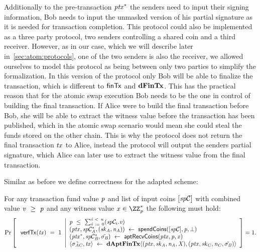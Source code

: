 \begin{definition}
\begin{itemize}
        Additionally to the pre-transaction $\mathit{ptx}^*$ the senders need to input their signing information, Bob needs to input the unmasked version of his partial signature as it is needed for transaction completion.
        This protocol could also be implemented as a three party protocol, two senders controlling a shared coin and a third receiver.
        However, as in our case, which we will describe later in~\cref{sec:atom:protocols}, one of the two senders is also the receiver, we allowed ourselves to model this protocol as being between only two parties to simplify the formalization.
        In this version of the protocol only Bob will be able to finalize the transaction, which is different to $\mathsf{finTx}$ and $\mathbf{dFinTx}$.
        This has the practical reason that for the atomic swap execution Bob needs to be the one in control of building the final transaction.
        If Alice were to build the final transaction before Bob, she will be able to extract the witness value before the transaction has been published, which in the atomic swap scenario would mean she could steal the funds stored on the other chain.
        This is why the protocol does not return the final transaction $\mathit{tx}$ to Alice, instead the protocol will output the senders partial signature, which Alice can later use to extract the witness value from the final transaction.
    \end{itemize}
\end{definition}

Similar as before we define correctness for the adapted scheme:

\begin{definition}
    \label{def:atom:apt-tx-scheme-correctness}
    For any transaction fund value $\mathit{p}$ and list of input coins $[\mathit{sp}\mathcal{C}]$ with combined value $\mathit{v} ~\geq~ \mathit{p}$ and any witness value $\varX \opIn \cnstIntegersPrimeWithoutZero{\varPrime}$ the following must hold:
    \[
        \Pr\left[
        \begin{array}{c}
            \: \mathsf{verfTx}(\mathit{tx}) ~=~ 1
        \end{array}
        \middle\vert
        \begin{array}{l}
            \mathit{p} ~\leq~ \sum_{\mathit{i} ~:=~ 0}^{\mathit{i} ~<~ \mathit{n}}(\mathit{sp}\mathcal{C}_{i}.\mathit{v}) \\
            (\mathit{ptx}, \mathit{sp}\mathcal{C}_{\mathit{A}}^*, (\mathit{sk}_{\mathit{A}}, \mathit{\mathit{n}_{\mathit{A}}})) ~\leftarrow~ \mathsf{spendCoins}([\mathit{sp}\mathcal{C}],\mathit{p},\bot) \\
            (\mathit{ptx}^*, \mathit{sp}\mathcal{C}_{\mathit{B}}^*, \tilde{\sigma_{\mathit{B}}}) ~\leftarrow~ \mathsf{aptRecvCoins}(\mathit{ptx},\mathit{p},\mathit{x}) \\
            \langle \tilde{\sigma_{\mathit{A}\mathit{C}}}, \mathit{tx} \rangle ~\leftarrow~ \mathbf{dAptFinTx} \langle (\mathit{ptx},\mathit{sk}_{\mathit{A}},\mathit{\mathit{n}_{\mathit{A}}},\mathit{X}), (\mathit{ptx},\mathit{sk}_{\mathit{C}},\mathit{\mathit{n}_{\mathit{C}}},\tilde{\sigma_{\mathit{B}}}) \rangle
        \end{array}
        \right]=1.
    \]
\end{definition}
